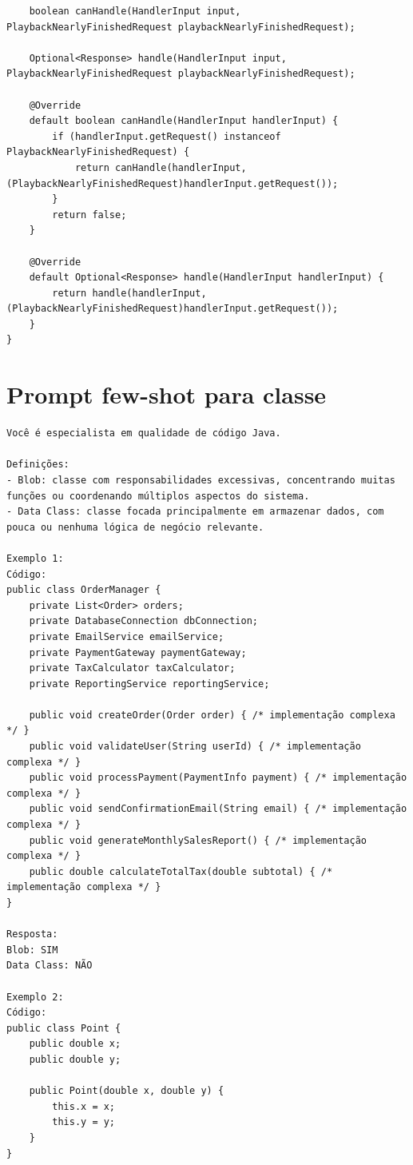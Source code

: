 \begin{apendicesenv}
\begin{verbatim}
	boolean canHandle(HandlerInput input, PlaybackNearlyFinishedRequest playbackNearlyFinishedRequest);

	Optional<Response> handle(HandlerInput input, PlaybackNearlyFinishedRequest playbackNearlyFinishedRequest);

	@Override
	default boolean canHandle(HandlerInput handlerInput) {
		if (handlerInput.getRequest() instanceof PlaybackNearlyFinishedRequest) {
			return canHandle(handlerInput, (PlaybackNearlyFinishedRequest)handlerInput.getRequest());
		}
		return false;
	}

	@Override
	default Optional<Response> handle(HandlerInput handlerInput) {
		return handle(handlerInput, (PlaybackNearlyFinishedRequest)handlerInput.getRequest());
	}
}
\end{verbatim}

\section{Prompt few-shot para classe}

\begin{verbatim}
Você é especialista em qualidade de código Java.

Definições:
- Blob: classe com responsabilidades excessivas, concentrando muitas funções ou coordenando múltiplos aspectos do sistema.
- Data Class: classe focada principalmente em armazenar dados, com pouca ou nenhuma lógica de negócio relevante.

Exemplo 1:
Código:
public class OrderManager {
	private List<Order> orders;
	private DatabaseConnection dbConnection;
	private EmailService emailService;
	private PaymentGateway paymentGateway;
	private TaxCalculator taxCalculator;
	private ReportingService reportingService;

	public void createOrder(Order order) { /* implementação complexa */ }
	public void validateUser(String userId) { /* implementação complexa */ }
	public void processPayment(PaymentInfo payment) { /* implementação complexa */ }
	public void sendConfirmationEmail(String email) { /* implementação complexa */ }
	public void generateMonthlySalesReport() { /* implementação complexa */ }
	public double calculateTotalTax(double subtotal) { /* implementação complexa */ }
}

Resposta:
Blob: SIM
Data Class: NÃO

Exemplo 2:
Código:
public class Point {
	public double x;
	public double y;

	public Point(double x, double y) {
		this.x = x;
		this.y = y;
	}
}


\end{verbatim}
\end{apendicesenv}
